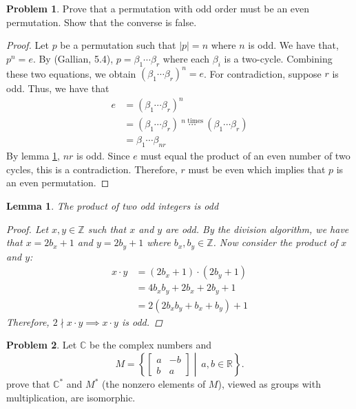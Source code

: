 \documentclass[12pt,reqno]{article}
\newcommand{\Z}{\mathbb{Z}}
\theoremstyle{plain}
\newtheorem{lemma}{Lemma}
\theoremstyle{definition}
\newtheorem{problem}{Problem}
\begin{document}
\newpage


\begin{problem}  
    Prove that a permutation with odd order must be an even permutation. Show that the converse is false.
\end{problem}

\begin{proof}
    Let \(p\) be a permutation such that \(|p|=n\) where \(n\) is odd. We have that, \(p^n=e\).
    By (Gallian, 5.4), \(p=\beta_1\cdots\beta_r\) where each \(\beta_i\) is a two-cycle.
    Combining these two equations, we obtain \((\beta_1\cdots\beta_r)^n=e\). For contradiction,
    suppose \(r\) is odd. Thus, we have that
    \begin{align*}
        e &= (\beta_1\cdots\beta_r)^n\\
        &= (\beta_1\cdots\beta_r)\ \overset{n\text{ times}}{\cdots}\ (\beta_1\cdots\beta_r)\\
        &= \beta_1\cdots\beta_{nr}
    \end{align*}
    By lemma \ref{lem:oddmult}, \(nr\) is odd. Since \(e\) must equal the product of an even number of two cycles, this is a contradiction.
    Therefore, \(r\) must be even which implies that \(p\) is an even permutation.
\end{proof}
\bigskip
\begin{lemma}
    \label{lem:oddmult}
    The product of two odd integers is odd
    \begin{proof}
        Let \(x,y\in\Z\) such that \(x\) and \(y\) are odd. By the division algorithm, we have that
        \(x=2b_x+1\) and \(y=2b_y+1\) where \(b_x,b_y\in\Z\). Now consider the product of \(x\) and \(y\):
        \begin{align*}
            x\cdot y &= (2b_x+1)\cdot (2b_y+1)\\
            &= 4b_xb_y+2b_x+2b_y+1\\
            &= 2(2b_xb_y+b_x+b_y)+1
        \end{align*}
        Therefore, \(2\nmid x\cdot y\implies x\cdot y\) is odd.
    \end{proof}
\end{lemma}

\newpage


\begin{problem} 
    Let $\mathbb{C}$ be the complex numbers and 
    $$
    M = \left \{
    \begin{bmatrix}
       a  & -b \\
       b  &  a
    \end{bmatrix}
    \middle| \  a,b \in \mathbb{R}
    \right \}.
    $$
    prove that $\mathbb{C}^*$ and $M^*$ (the nonzero elements of $M$), viewed as groups with multiplication, are isomorphic. 
\end{problem}
\end{document}
